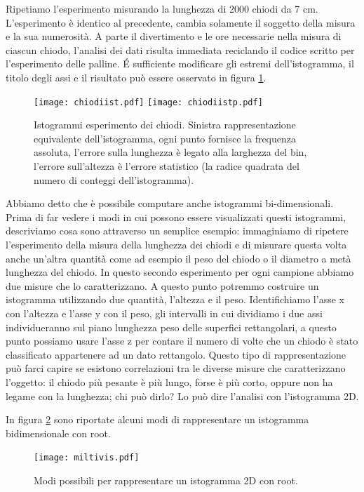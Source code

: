 \documentclass[11pt,fleqn]{book} %
\begin{document}
Ripetiamo l'esperimento misurando la lunghezza di 2000 chiodi da 7 cm. L'esperimento è identico al precedente, cambia solamente il soggetto della misura e la sua numerosità. A parte il divertimento e le ore necessarie nella misura di ciascun chiodo, l'analisi dei dati risulta immediata reciclando il codice scritto per l'esperimento delle palline. \'E sufficiente modificare gli estremi dell'istogramma, il titolo degli assi e il risultato può essere osservato in figura \ref{chiodi}.


\begin{figure}
\centering
\texttt{[image: chiodiist.pdf]}
\texttt{[image: chiodiistp.pdf]}
\caption{Istogrammi esperimento dei chiodi. Sinistra rappresentazione equivalente dell'istogramma, ogni punto fornisce la frequenza assoluta, l'errore sulla lunghezza è legato alla larghezza del bin, l'errore sull'altezza è l'errore statistico (la radice quadrata del numero di conteggi dell'istogramma).\label{chiodi}}
\end{figure}

Abbiamo detto che è possibile computare anche istogrammi bi-dimensionali.
Prima di far vedere i modi in cui possono essere visualizzati questi istogrammi, descriviamo cosa sono attraverso un semplice esempio:
immaginiamo di ripetere l'esperimento della misura della lunghezza dei chiodi e di misurare questa volta anche un'altra quantità come ad esempio il peso del chiodo o il diametro a metà lunghezza del chiodo. In questo secondo esperimento per ogni campione abbiamo due misure che lo caratterizzano. A questo punto potremmo costruire un istogramma utilizzando due quantità, l'altezza e il peso. Identifichiamo l'asse x con l'altezza e l'asse y con il peso, gli intervalli in cui dividiamo i due assi individueranno sul piano lunghezza peso delle superfici rettangolari, a questo punto possiamo usare l'asse z per contare il numero di volte che un chiodo è stato classificato appartenere ad un dato rettangolo. Questo tipo di rappresentazione può farci capire se esistono correlazioni tra le diverse misure che caratterizzano l'oggetto: il chiodo più pesante è più lungo, forse è più corto, oppure non ha legame con la lunghezza; chi può dirlo? Lo può dire l'analisi con l'istogramma 2D.

In figura \ref{bidimy} sono riportate alcuni modi di rappresentare un istogramma bidimensionale con root.


\begin{figure}
\centering
\texttt{[image: miltivis.pdf]}
\caption{Modi possibili per rappresentare un istogramma 2D con root.\label{bidimy}}
\end{figure}
\end{document}
